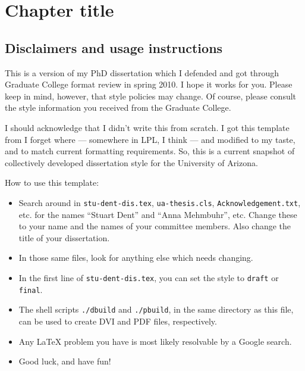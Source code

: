 \chapter{Chapter title}
\label{chap:one_chapter}

\section{Disclaimers and usage instructions}

This is a version of my PhD dissertation which I defended and got through
Graduate College format review in spring 2010.  I hope it works for you.
Please keep in mind, however, that style policies may change.  Of course,
please consult the style information you received from the Graduate College.

I should acknowledge that I didn't write this from scratch.  I got this
template from I forget where --- somewhere in LPL, I think --- and modified to
my taste, and to match current formatting requirements.  So, this is a current
snapshot of collectively developed dissertation style for the University
of Arizona.

How to use this template:

\begin{itemize}

\item Search around in
\texttt{stu-dent-dis.tex},
\texttt{ua-thesis.cls},
\texttt{Acknowledgement.txt}, etc. for the names ``Stuart Dent'' and
``Anna Mehmbuhr'', etc.  Change these to your name and the names of your
committee members.  Also change the title of your dissertation.

\item In those same files, look for anything else which needs changing.

\item In the first line of \texttt{stu-dent-dis.tex}, you can set the style to
\texttt{draft} or \texttt{final}.

\item The shell scripts \texttt{./dbuild} and \texttt{./pbuild}, in the
same directory as this file, can be used to create DVI and PDF files,
respectively.

\item Any {\LaTeX} problem you have is most likely resolvable by a Google
search.

\item Good luck, and have fun!

\end{itemize}

